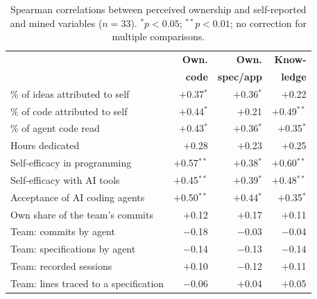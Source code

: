 \documentclass[conference]{IEEEtran}
\begin{document}
\begin{table}[t]
\centering
\caption{Spearman correlations between perceived ownership and self-reported and mined variables ($n = 33$). $^{*}p < 0.05$; $^{**}p < 0.01$; no correction for multiple comparisons.}
\label{tab:corr}
\footnotesize
\setlength{\tabcolsep}{3pt}
\begin{tabular}{@{}l r r r@{}}
\toprule
& \textbf{Own.} & \textbf{Own.} & \textbf{Know-} \\
& \textbf{code} & \textbf{spec/app} & \textbf{ledge} \\
\midrule
\% of ideas attributed to self & $+$0.37$^{*}$ & $+$0.36$^{*}$ & $+$0.22 \\
\% of code attributed to self & $+$0.44$^{*}$ & $+$0.21 & $+$0.49$^{**}$ \\
\% of agent code read & $+$0.43$^{*}$ & $+$0.36$^{*}$ & $+$0.35$^{*}$ \\
Hours dedicated & $+$0.28 & $+$0.23 & $+$0.25 \\
Self-efficacy in programming & $+$0.57$^{**}$ & $+$0.38$^{*}$ & $+$0.60$^{**}$ \\
Self-efficacy with AI tools & $+$0.45$^{**}$ & $+$0.39$^{*}$ & $+$0.48$^{**}$ \\
Acceptance of AI coding agents & $+$0.50$^{**}$ & $+$0.44$^{*}$ & $+$0.35$^{*}$ \\
\midrule
Own share of the team's commits & $+$0.12 & $+$0.17 & $+$0.11 \\
Team: commits by agent & $-$0.18 & $-$0.03 & $-$0.04 \\
Team: specifications by agent & $-$0.14 & $-$0.13 & $-$0.14 \\
Team: recorded sessions & $+$0.10 & $-$0.12 & $+$0.11 \\
Team: lines traced to a specification & $-$0.06 & $+$0.04 & $+$0.05 \\
\bottomrule
\end{tabular}
\end{table}
\end{document}
